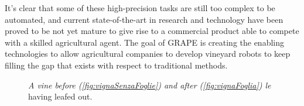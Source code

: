 It's clear that some of these high-precision tasks are still too complex to be automated, and current state-of-the-art in research and technology have been proved to be not yet mature to give rise to a commercial product able to compete with a skilled agricultural agent. The goal of \ac{GRAPE} is creating the enabling technologies to allow agricultural companies to develop vineyard robots to keep filling the gap that exists with respect to traditional methods.

\begin{figure}
	\centering
	\qquad
	\caption{\textit{A vine before (\ref{fig:vignaSenzaFoglie}) and after (\ref{fig:vignaFoglia}) le} having leafed out.}
	\label{fig:vignaConSenzaFoglie}
\end{figure}


